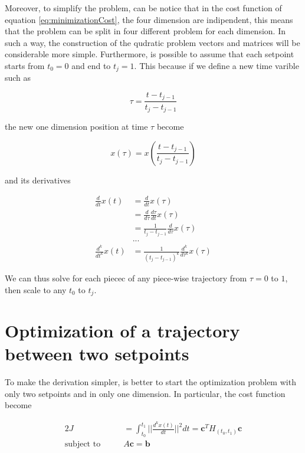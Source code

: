 \noindent Moreover, to simplify the problem, can be notice that in the cost function of equation \eqref{eq:minimizationCost}, the four dimension are indipendent, this means that the problem can be split in four different problem for each dimension. In such a way, the construction of the qudratic problem vectors and matrices will be considerable more simple. Furthermore, is possible to assume that each setpoint starts from $t_0=0$ and end to $t_j=1$. This because if we define a new time varible such as

\begin{equation}
	\tau = \frac{t-t_{j-1}}{t_j-t_{j-1}}
	\label{eq:simplyTime}
\end{equation}

\noindent the new one dimension position at time $\tau$ become

\begin{equation}
	x(\tau) = x(\frac{t-t_{j-1}}{t_j-t_{j-1}})	
\end{equation}

\noindent and its derivatives

\begin{align*}
	\frac{d}{dt}x(t) &= \frac{d}{dt}x(\tau) \\
	&= \frac{d}{d\tau}\frac{d\tau}{dt}x(\tau) \\
	&= \frac{1}{t_j-t_{j-1}}\frac{d}{d\tau}x(\tau) \\
	&... \\
	\frac{d^k}{dt^k}x(t) &= \frac{1}{(t_j-t_{j-1})^k}\frac{d^k}{d\tau^k}x(\tau)
\end{align*}

\noindent We can thus solve for each piecec of any piece-wise trajectory from $\tau=0$ to $1$, then scale to any $t_0$ to $t_j$.


\section{Optimization of a trajectory between two setpoints}

To make the derivation simpler, is better to start the optimization problem with only two setpoints and in only one dimension. In particular, the cost function become 

\begin{alignat}{2}
	J &= \int_{t_0}^{t_1}\Bigg|\Bigg|\frac{d^kx(t)}{dt}\Bigg|\Bigg|^2dt = \mathbf{c}^TH_{(t_0,t_1)}\mathbf{c} \\
	\text{subject to}\qquad & A\mathbf{c} = \mathbf{b} \nonumber
	\label{eq:oneSetpoint}
\end{alignat}

